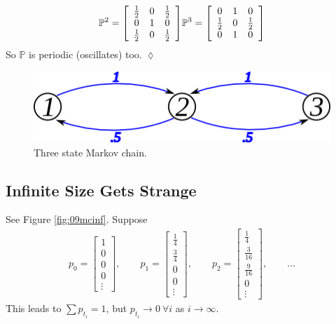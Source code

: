 \begin{example}
\begin{align*}
\begin{split}
\mathbb{P}^2 = \left[\begin{array}{c c c} \frac{1}{2} & 0 & \frac{1}{2} \\ 0 & 1 & 0 \\ \frac{1}{2} & 0 & \frac{1}{2} \end{array}\right]
\end{split}
\begin{split}
\mathbb{P}^3 = \left[\begin{array}{c c c} 0 & 1 & 0 \\ \frac{1}{2} & 0 & \frac{1}{2} \\ 0 & 1 & 0 \end{array}\right]
\end{split}
\end{align*}
So $\mathbb{P}$ is periodic (oscillates) too.
$\lozenge$
\end{example}

\begin{figure}[ht!]
	\centering
	\includegraphics[width=.4\textwidth]{images/09mc3}
	\caption{Three state Markov chain.}
	\label{fig:09mc3}
\end{figure}

\subsection{Infinite Size Gets Strange}
See Figure \ref{fig:09mcinf}. Suppose
\begin{align*}
p_0 = \left[\begin{array}{c} 1 \\ 0 \\ 0 \\ 0 \\ \vdots \end{array}\right],
\qquad p_1 = \left[\begin{array}{c} \frac{1}{4} \\ \frac{3}{4} \\ 0 \\ 0 \\ \vdots \end{array}\right],
\qquad p_2 = \left[\begin{array}{c} \frac{1}{4} \\ \frac{3}{16} \\ \frac{9}{16} \\ 0 \\ \vdots \end{array}\right],
\qquad \ldots
\end{align*}
This leads to $\sum p_{t_i}=1$, but $p_{t_i}\rightarrow 0 ~\forall i$ as $i\to\infty$.

